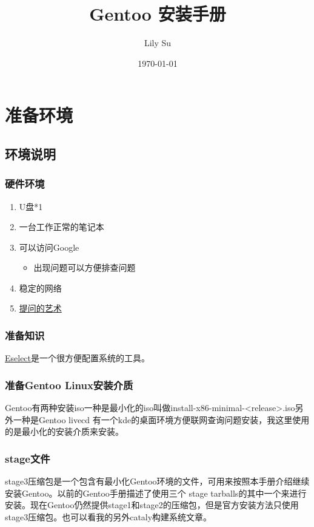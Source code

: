 \documentclass{book}
\author{Lily Su}
\date{\today}
\begin{document}
\title{Gentoo 安装手册}
\maketitle
%
\frontmatter
\tableofcontents
%
\chapter{准备环境}
\section{环境说明}
\subsection{硬件环境}
\begin{enumerate}
\item U盘*1
\item 一台工作正常的笔记本
\item 可以访问Google
  \begin{itemize}
    \item 出现问题可以方便排查问题
  \end{itemize}
\item 稳定的网络
  \item \href{https://github.com/ryanhanwu/How-To-Ask-Questions-The-Smart-Way/blob/master/README-zh_CN.md}{提问的艺术}
\end{enumerate}



\subsection{准备知识}
\href{https://wiki.gentoo.org/wiki/Eselect}{Eselect}是一个很方便配置系统的工具。

\subsection{准备Gentoo Linux安装介质}
Gentoo有两种安装iso一种是最小化的iso叫做install-x86-minimal-<release>.iso另外一种是Gentoo livecd 有一个kde的桌面环境方便联网查询问题安装，我这里使用的是最小化的安装介质来安装。
\subsection{stage文件}
stage3压缩包是一个包含有最小化Gentoo环境的文件，可用来按照本手册介绍继续安装Gentoo。以前的Gentoo手册描述了使用三个 stage tarballs的其中一个来进行安装。现在Gentoo仍然提供stage1和stage2的压缩包，但是官方安装方法只使用stage3压缩包。也可以看我的另外cataly构建系统文章。
\end{document}
